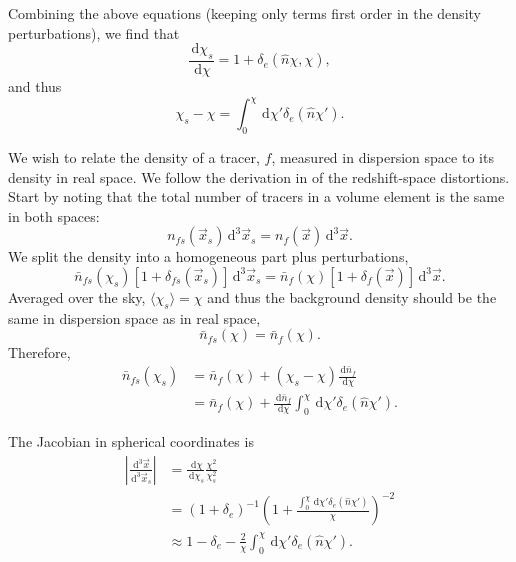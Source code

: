 \documentclass[twocolumn,prl,nofootinbib,floatfix]{revtex4-1}
\newcommand{\ud}{\,\mathrm{d}}
\begin{document}
Combining the above equations (keeping only terms first order in the density
perturbations), we find that
\begin{equation}
\frac{\ud \chi_s}{\ud \chi} = 1 + \delta_e(\hat n \chi, \chi),
\end{equation}
and thus
\begin{equation}
\chi_s - \chi = \int_0^\chi \ud \chi' \delta_e(\hat n \chi').
\end{equation}

We wish to relate the density of a tracer, $f$, measured in dispersion space to its
density in real space. We follow the derivation in \citet{1987MNRAS.227....1K}
of the
redshift-space distortions. Start by noting that the total number of tracers
in a volume element is the same in both spaces:
\begin{equation}
n_{fs}(\vec x_s) \ud^3\vec x_s = n_{f}(\vec x) \ud^3\vec x.
\end{equation}
We split the density into a homogeneous part plus perturbations,
\begin{equation}
\label{e:density}
    \bar{n}_{fs}(\chi_s)\left[ 1 + \delta_{fs}(\vec x_s)\right] \ud^3\vec x_s
    = \bar{n}_{f}(\chi)\left[ 1 + \delta_f(\vec x)\right] \ud^3\vec x.
\end{equation}
Averaged over the sky, $\langle \chi_s \rangle = \chi$ and thus the background
density should
be the same in dispersion space as in real space,
\begin{equation}
\bar{n}_{fs}(\chi) = \bar{n}_f(\chi).
\end{equation}
Therefore,
\begin{align}
\bar{n}_{fs}(\chi_s) 
    &= \bar{n}_{f}(\chi) + (\chi_s - \chi)\frac{\ud \bar{n}_f}{\ud \chi}\\
    &= \bar{n}_{f}(\chi)
       + \frac{\ud \bar{n}_f}{\ud \chi}\int_0^\chi \ud \chi' \delta_e(\hat n
       \chi').
       \label{e:nfs}
\end{align}

The Jacobian in spherical coordinates is
\begin{align}
\left| \frac{\ud^3\vec x}{\ud^3\vec x_s} \right|
    &= \frac{\ud \chi}{\ud \chi_s}\frac{\chi^2}{\chi_s^2}\\
    &= (1 + \delta_e)^{-1}
       \left(1 + \frac{\int_0^\chi \ud \chi' \delta_e(\hat n \chi')}
                      {\chi}\right)^{-2}\\
    &\approx 1 - \delta_e
        - \frac{2}{\chi}\int_0^\chi \ud \chi' \delta_e(\hat n \chi').
        \label{e:jac}
\end{align}
\end{document}

